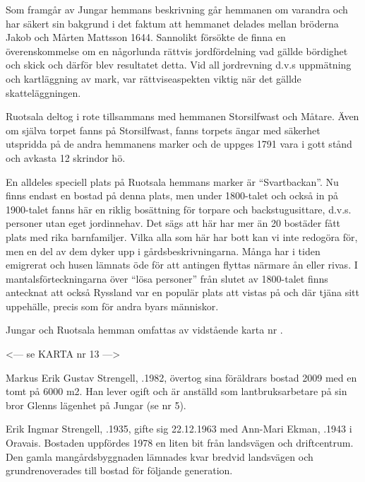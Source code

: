 Som framgår av Jungar hemmans beskrivning går hemmanen om varandra och har säkert sin bakgrund i det faktum att hemmanet delades mellan bröderna Jakob och Mårten Mattsson 1644. Sannolikt försökte de finna en överenskommelse om en någorlunda rättvis jordfördelning vad gällde bördighet och skick och därför blev resultatet detta. Vid all jordrevning d.v.s uppmätning och kartläggning av mark, var rättviseaspekten viktig när det gällde skatteläggningen.

Ruotsala deltog i rote tillsammans med hemmanen Storsilfwast och Måtare. Även om själva torpet fanns på Storsilfwast, fanns torpets ängar med säkerhet utspridda på de andra hemmanens marker och de uppges 1791 vara i gott stånd och avkasta 12 skrindor hö.

En alldeles speciell plats på Ruotsala hemmans marker är ``Svartbackan''. Nu finns endast en bostad på denna plats, men under 1800-talet och också in på 1900-talet fanns här en riklig bosättning för torpare och backstugusittare, d.v.s. personer utan eget jordinnehav. Det sägs att här har mer än 20 bostäder fått plats med rika barnfamiljer. Vilka alla som här har bott kan vi inte redogöra för, men en del av dem dyker upp i gårdsbeskrivningarna. Många har i tiden emigrerat och husen lämnats öde för att antingen flyttas närmare ån eller rivas. I mantalsförteckningarna över ``lösa personer'' från slutet av 1800-talet finns antecknat att också Ryssland var en populär plats att vistas på och där tjäna sitt uppehälle, precis som för andra byars människor.

Jungar och Ruotsala hemman omfattas av vidstående karta nr .


<--- se KARTA nr 13 --->






Markus Erik Gustav Strengell, .1982, övertog sina föräldrars bostad 2009 med en tomt på 6000 m2. Han lever ogift och är anställd som lantbruksarbetare på sin bror Glenns lägenhet på Jungar (se nr 5).\jhvspace{}



Erik Ingmar Strengell, .1935, gifte sig 22.12.1963 med Ann-Mari Ekman, .1943 i Oravais. Bostaden uppfördes 1978 en liten bit från landsvägen och driftcentrum. Den gamla mangårdsbyggnaden lämnades kvar bredvid landsvägen och grundrenoverades till bostad för följande generation.\jhvspace{}



